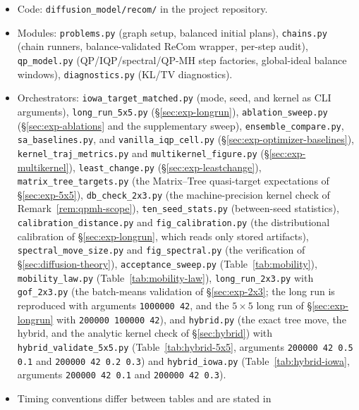 \documentclass[11pt]{article}
\begin{document}
\begin{itemize}
  \item Code: \texttt{diffusion\_model/recom/} in the project
    repository.
  \item Modules: \texttt{problems.py} (graph setup, balanced initial
    plans), \texttt{chains.py} (chain runners, balance-validated
    ReCom wrapper, per-step audit), \texttt{qp\_model.py}
    (QP/IQP/spectral/QP-MH step factories, global-ideal balance
    windows), \texttt{diagnostics.py} (KL/TV diagnostics).
  \item Orchestrators: \texttt{iowa\_target\_matched.py} (mode, seed,
    and kernel as CLI arguments), \texttt{long\_run\_5x5.py}
    (\S\ref{sec:exp-longrun}), \texttt{ablation\_sweep.py}
    (\S\ref{sec:exp-ablations} and the supplementary sweep),
    \texttt{ensemble\_compare.py}, \texttt{sa\_baselines.py}, and
    \texttt{vanilla\_iqp\_cell.py}
    (\S\ref{sec:exp-optimizer-baselines}),
    \texttt{kernel\_traj\_metrics.py} and
    \texttt{multikernel\_figure.py} (\S\ref{sec:exp-multikernel}),
    \texttt{least\_change.py} (\S\ref{sec:exp-leastchange}),
    \texttt{matrix\_tree\_targets.py} (the Matrix--Tree
    quasi-target expectations of \S\ref{sec:exp-5x5}),
    \texttt{db\_check\_2x3.py} (the machine-precision kernel check of
    Remark~\ref{rem:qpmh-scope}),
    \texttt{ten\_seed\_stats.py} (between-seed statistics),
    \texttt{calibration\_distance.py} and \texttt{fig\_calibration.py}
    (the distributional calibration of \S\ref{sec:exp-longrun}, which
    reads only stored artifacts),
    \texttt{spectral\_move\_size.py} and \texttt{fig\_spectral.py}
    (the verification of \S\ref{sec:diffusion-theory}),
    \texttt{acceptance\_sweep.py} (Table~\ref{tab:mobility}),
    \texttt{mobility\_law.py} (Table~\ref{tab:mobility-law}),
    \texttt{long\_run\_2x3.py} with \texttt{gof\_2x3.py} (the
    batch-means validation of \S\ref{sec:exp-2x3}; the long run is
    reproduced with arguments \texttt{1000000 42}, and the
    $5 \times 5$ long run of \S\ref{sec:exp-longrun} with
    \texttt{200000 100000 42}), and \texttt{hybrid.py} (the exact
    tree move, the hybrid, and the analytic kernel check of
    \S\ref{sec:hybrid}) with \texttt{hybrid\_validate\_5x5.py}
    (Table~\ref{tab:hybrid-5x5}, arguments \texttt{200000 42 0.5 0.1}
    and \texttt{200000 42 0.2 0.3}) and \texttt{hybrid\_iowa.py}
    (Table~\ref{tab:hybrid-iowa}, arguments \texttt{200000 42 0.1}
    and \texttt{200000 42 0.3}).
  \item Timing conventions differ between tables and are stated in

\end{itemize}
\end{document}
